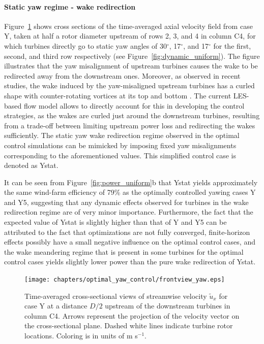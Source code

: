 	\paragraph{Static yaw regime - wake redirection}
	Figure~\ref{fig:cross_section} shows cross sections of the time-averaged axial velocity field from case Y, taken at half a rotor diameter upstream of rows 2, 3, and 4 in column C4, for which turbines directly go to static yaw angles of 30$^\circ$, 17$^\circ$, and 17$^\circ$ for the first, second, and third row respectively (see Figure~\ref{fig:dynamic_uniform}). The figure illustrates that the yaw misalignment of upstream turbines causes the wake to be redirected away from the downstream ones. Moreover, as observed in recent studies, the wake induced by the yaw-misaligned upstream turbines has a curled shape with counter-rotating vortices at its top and bottom \citep{howland2016wake,bastankhah2016experimental}. The current LES-based flow model allows to directly account for this in developing the control strategies, as the wakes are curled just around the downstream turbines, resulting from a trade-off between limiting upstream power loss and redirecting the wakes sufficiently. The static yaw wake redirection regime observed in the optimal control simulations can be mimicked by imposing fixed yaw misalignments corresponding to the aforementioned values. This simplified control case is denoted as Ystat. 
	
	It can be seen from Figure~\ref{fig:power_uniform}b that Ystat yields approximately the same wind-farm efficiency of 79\% as the optimally controlled yawing cases Y and Y5, suggesting that any dynamic effects observed for turbines in the wake redirection regime are of very minor importance. Furthermore, the fact that the expected value of Ystat is slightly higher than that of Y and Y5 can be attributed to the fact that optimizations are not fully converged, finite-horizon effects possibly have a small negative influence on the optimal control cases, and the wake meandering regime that is present in some turbines for the optimal control cases yields slightly lower power than the pure wake redirection of Ystat.
	
	\begin{figure}
		\texttt{[image: chapters/optimal\_yaw\_control/frontview\_yaw.eps]}
		\caption[Time-averaged cross-sectional views of streamwise velocity $\widetilde{u}_x$ for case Y at a distance $D/2$ upstream of the downstream turbines in column C4.]{Time-averaged cross-sectional views of streamwise velocity $\widetilde{u}_x$ for case Y at a distance $D/2$ upstream of the downstream turbines in column C4. Arrows represent the projection of the velocity vector on the cross-sectional plane. Dashed white lines indicate turbine rotor locations. Coloring is in units of m s$^{-1}$. \label{fig:cross_section}}
	\end{figure}
	
